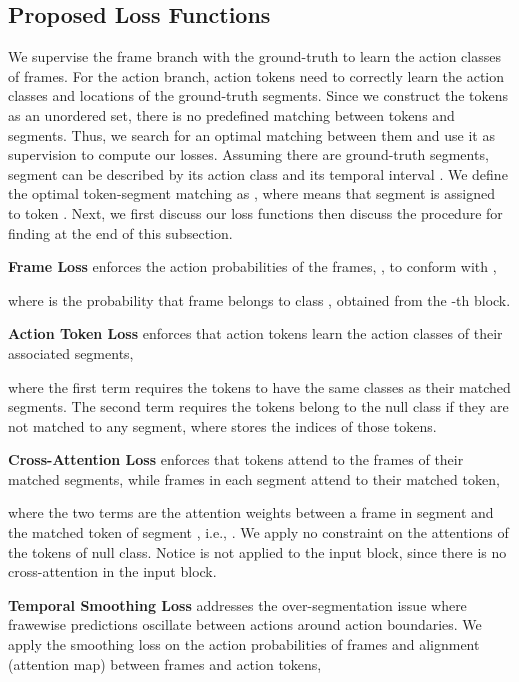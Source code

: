 \documentclass[10pt,twocolumn,letterpaper]{article}
\newcommand{\headline}[1]{\noindent \textbf{#1}}
\newcommand{\0}{\boldsymbol{0}}
\begin{document}
\subsection{Proposed Loss Functions}
\label{sec:loss}

We supervise the frame branch with the ground-truth  to learn the action classes of frames. 
For the action branch, action tokens need to correctly learn the action classes and locations of the ground-truth segments. 
Since we construct the tokens as an unordered set, there is no predefined matching between tokens and segments. Thus, we search for an optimal matching between them and use it as supervision to compute our losses.  
Assuming there are  ground-truth segments, segment  can be described by its action class  and its temporal interval . 
We define the optimal token-segment matching as , where  means that segment  is assigned to token . Next, we first discuss our loss functions then discuss the procedure for finding  at the end of this subsection. 



\headline{Frame Loss} enforces the action probabilities of the frames, , to conform with ,

where  is the probability that frame  belongs to class , obtained from the -th block.


\headline{Action Token Loss} enforces that action tokens learn the action classes of their associated segments,

where the first term requires the tokens to have the same classes as their matched segments. The second term requires the tokens belong to the null class if they are not matched to any segment, where  stores the indices of those tokens.

\headline{Cross-Attention Loss} enforces that tokens attend to the frames of their matched segments, while frames in each segment attend to their matched token,

where the two terms are the attention weights between a frame  in segment  and the matched token of segment , i.e., .
We apply no constraint on the attentions of the tokens of null class.
Notice  is not applied to the input block, since there is no cross-attention in the input block. 


 
\headline{Temporal Smoothing Loss} addresses the over-segmentation issue where frawewise predictions oscillate between actions around action boundaries. We apply the smoothing loss on the action probabilities of frames and alignment (attention map) between frames and action tokens,
\end{document}
